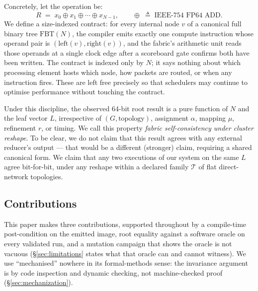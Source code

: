 \documentclass[journal,10pt]{IEEEtran}
\theoremstyle{plain}
\theoremstyle{definition}
\theoremstyle{remark}
\newcommand{\FBT}{\ensuremath{\mathrm{FBT}}}
\newcommand{\T}{\ensuremath{\mathcal{T}}}
\begin{document}
Concretely, let the operation be:
\begin{equation}
  R \;=\; x_0 \oplus x_1 \oplus \cdots \oplus x_{N-1},
  \qquad \oplus \;\triangleq\;\text{IEEE-754 FP64 ADD}.
\end{equation}
We define a size-indexed contract: for every internal node $v$ of a
canonical full binary tree $\FBT(N)$, the compiler emits exactly one
compute instruction whose operand pair is $(\mathrm{left}(v),
\mathrm{right}(v))$, and the fabric's arithmetic unit reads those operands
at a single clock edge after a scoreboard gate confirms both have been
written.  The contract is indexed only by $N$; it says nothing about which
processing element hosts which node, how packets are routed, or when any
instruction fires.  These are left free precisely so that schedulers may
continue to optimise performance without touching the contract.

Under this discipline, the observed 64-bit root result is a pure function
of $N$ and the leaf vector $L$, irrespective of $(G,\text{topology})$,
assignment $\alpha$, mapping $\mu$, refinement $r$, or timing. We call this
property \emph{fabric self-consistency under cluster reshape}. To be
clear, we do not claim that this result agrees with any external reducer's
output --- that would be a different (stronger) claim, requiring a shared
canonical form. We claim that any two executions of our system on the same
$L$ agree bit-for-bit, under any reshape within a declared family $\T$ of
flat direct-network topologies.

\subsection{Contributions}

This paper makes three contributions, supported throughout by a
compile-time post-condition on the emitted image, root equality against a
software oracle on every validated run, and a mutation campaign that shows
the oracle is not vacuous (\S\ref{sec:limitations} states what that oracle
can and cannot witness). We use ``mechanised'' nowhere in its
formal-methods sense: the invariance argument is by code inspection and
dynamic checking, not machine-checked proof (\S\ref{sec:mechanization}).
\end{document}
